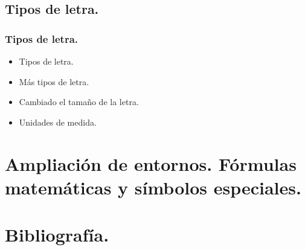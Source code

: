 \documentclass{beamer}
\begin{document}
\subsection{Tipos de letra.}
\begin{frame}
  \frametitle{Tipos de letra.}
  \begin{itemize}
  \item<1->{Tipos de letra.}
  \item<2->{Más tipos de letra.}
  \item<3->{Cambiado el tamaño de la letra.}
  \item<4->{Unidades de medida.}
  \end{itemize}
\end{frame}

\section{Ampliación de entornos. Fórmulas matemáticas y símbolos especiales.}

\section{Bibliografía.}
\end{document}
